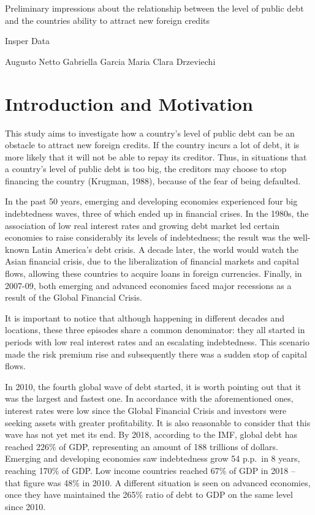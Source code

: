 \documentclass[]{article}
\author{}
\date{\vspace{-2.5em}}
\begin{document}
{
\setcounter{tocdepth}{2}
\tableofcontents
}
Preliminary impressions about the relationship between the level of
public debt and the countries ability to attract new foreign credits

Insper Data

Augusto Netto Gabriella Garcia Maria Clara Drzeviechi

\section{Introduction and Motivation}\label{introduction-and-motivation}

This study aims to investigate how a country's level of public debt can
be an obstacle to attract new foreign credits. If the country incurs a
lot of debt, it is more likely that it will not be able to repay its
creditor. Thus, in situations that a country's level of public debt is
too big, the creditors may choose to stop financing the country
(Krugman, 1988), because of the fear of being defaulted.

In the past 50 years, emerging and developing economies experienced four
big indebtedness waves, three of which ended up in financial crises. In
the 1980s, the association of low real interest rates and growing debt
market led certain economies to raise considerably its levels of
indebtedness; the result was the well-known Latin America's debt crisis.
A decade later, the world would watch the Asian financial crisis, due to
the liberalization of financial markets and capital flows, allowing
these countries to acquire loans in foreign currencies. Finally, in
2007-09, both emerging and advanced economies faced major recessions as
a result of the Global Financial Crisis.

It is important to notice that although happening in different decades
and locations, these three episodes share a common denominator: they all
started in periods with low real interest rates and an escalating
indebtedness. This scenario made the risk premium rise and subsequently
there was a sudden stop of capital flows.

In 2010, the fourth global wave of debt started, it is worth pointing
out that it was the largest and fastest one. In accordance with the
aforementioned ones, interest rates were low since the Global Financial
Crisis and investors were seeking assets with greater profitability. It
is also reasonable to consider that this wave has not yet met its end.
By 2018, according to the IMF, global debt has reached 226\% of GDP,
representing an amount of 188 trillions of dollars. Emerging and
developing economies saw indebtedness grow 54 p.p.~in 8 years, reaching
170\% of GDP. Low income countries reached 67\% of GDP in 2018 -- that
figure was 48\% in 2010. A different situation is seen on advanced
economies, once they have maintained the 265\% ratio of debt to GDP on
the same level since 2010.
\end{document}
